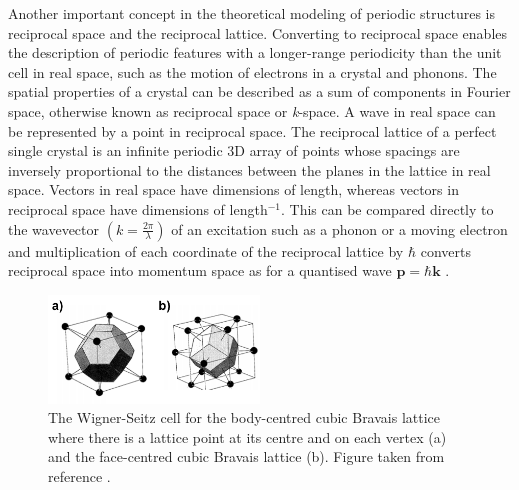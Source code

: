 \documentclass[11pt, twoside]{report}
\begin{document}
Another important concept in the theoretical modeling of periodic structures is reciprocal space and the reciprocal lattice. 
Converting to reciprocal space enables the description of periodic features with a longer-range periodicity than the unit cell in real space, such as the motion of electrons in a crystal and phonons.
The spatial properties of a crystal can be described as a sum of components in Fourier space, otherwise known as reciprocal space or \textit{k}-space. A wave in real space can be represented by a point in reciprocal space. The reciprocal lattice of a perfect single crystal is an infinite periodic 3D array of points whose spacings are inversely proportional to the distances between the planes in the lattice in real space. Vectors in real space have dimensions of length, whereas vectors in reciprocal space have dimensions of length$^{-1}$. This can be compared directly to the wavevector $ \left(k  = \frac{2\pi}{\lambda} \right)$ of an excitation such as a phonon or a moving electron and multiplication of each coordinate of the reciprocal lattice by $\hbar$ converts reciprocal space into momentum space as for a quantised wave $\mathbf{p} = \hbar \mathbf{k}$ \cite{Blakemore1}. 

\begin{figure}[h!]
  \centering
    \includegraphics[width=0.5\textwidth]{figures/Wigner-Seitz.png}
    \caption{The Wigner-Seitz cell for the body-centred cubic Bravais lattice where there is a lattice point at its centre and on each vertex (a) and the face-centred cubic Bravais lattice (b). 
    Figure taken from reference .}
  \label{Wigner-Seitz}
\end{figure}
\end{document}
